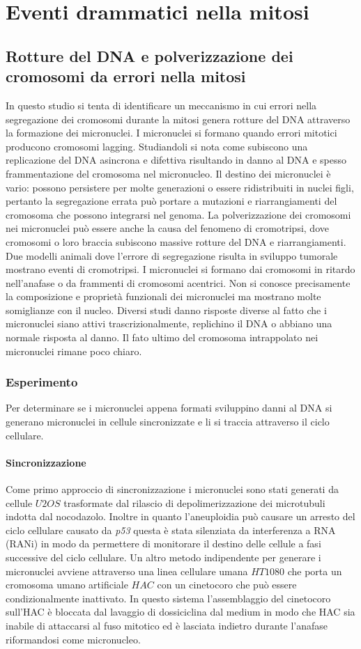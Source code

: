 \section{Eventi drammatici nella mitosi}
\subsection{Rotture del DNA e polverizzazione dei cromosomi da errori nella mitosi}
In questo studio si tenta di identificare un meccanismo in cui errori nella segregazione dei cromosomi durante la mitosi genera rotture del DNA attraverso la formazione dei micronuclei. 
I micronuclei si formano quando errori mitotici producono cromosomi lagging. Studiandoli si nota come subiscono una replicazione del DNA asincrona e difettiva risultando in danno al
DNA e spesso frammentazione del cromosoma nel micronucleo. Il destino dei micronuclei \`e vario: possono persistere per molte generazioni o essere ridistribuiti in nuclei figli, pertanto
la segregazione errata pu\`o portare a mutazioni e riarrangiamenti del cromosoma che possono integrarsi nel genoma. La polverizzazione dei cromosomi nei micronuclei pu\`o essere anche
la causa del fenomeno di cromotripsi, dove cromosomi o loro braccia subiscono massive rotture del DNA e riarrangiamenti. Due modelli animali dove l'errore di segregazione risulta in 
sviluppo tumorale mostrano eventi di cromotripsi. I micronuclei si formano dai cromosomi in ritardo nell'anafase o da frammenti di cromosomi acentrici. Non si conosce precisamente la
composizione e propriet\`a funzionali dei micronuclei ma mostrano molte somiglianze con il nucleo. Diversi studi danno risposte diverse al fatto che i micronuclei siano attivi 
trascrizionalmente, replichino il DNA o abbiano una normale risposta al danno. Il fato ultimo del cromosoma intrappolato nei micronuclei rimane poco chiaro. 
\subsubsection{Esperimento}
Per determinare se i micronuclei appena formati sviluppino danni al DNA si generano micronuclei in cellule sincronizzate e li si traccia attraverso il ciclo cellulare. 
\paragraph{Sincronizzazione} 
Come primo approccio di sincronizzazione i micronuclei sono stati generati da cellule $U2OS$ trasformate dal rilascio di depolimerizzazione dei microtubuli indotta dal nocodazolo. 
Inoltre in quanto l'aneuploidia pu\`o causare un arresto del ciclo cellulare causato da \emph{p53} questa \`e stata silenziata da interferenza a RNA (RANi) in modo da permettere di 
monitorare il destino delle cellule a fasi successive del ciclo cellulare. Un altro metodo indipendente per generare i micronuclei avviene attraverso una linea cellulare umana $HT1080$ 
che porta un cromosoma umano artificiale $HAC$ con un cinetocoro che pu\`o essere condizionalmente inattivato. In questo sistema l'assemblaggio del cinetocoro sull'HAC \`e bloccata dal
lavaggio di dossiciclina dal medium in modo che HAC sia inabile di attaccarsi al fuso mitotico ed \`e lasciata indietro durante l'anafase riformandosi come micronucleo. 
